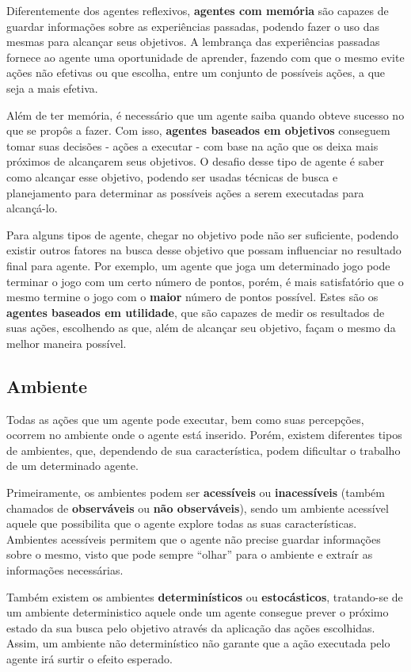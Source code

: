 Diferentemente dos agentes reflexivos, \textbf{agentes com memória} são capazes
de guardar informações sobre as experiências passadas, podendo fazer o uso das
mesmas para alcançar seus objetivos. A lembrança das experiências passadas
fornece ao agente uma oportunidade de aprender, fazendo com que o mesmo evite
ações não efetivas ou que escolha, entre um conjunto de possíveis ações, a que
seja a mais efetiva.

Além de ter memória, é necessário que um agente saiba quando obteve sucesso no
que se propôs a fazer. Com isso, \textbf{agentes baseados em objetivos}
conseguem tomar suas decisões - ações a executar - com base na ação que os
deixa mais próximos de alcançarem seus objetivos. O desafio desse tipo de
agente é saber como alcançar esse objetivo, podendo ser usadas técnicas de
busca e planejamento para determinar as possíveis ações a serem executadas para
alcançá-lo.

Para alguns tipos de agente, chegar no objetivo pode não ser suficiente,
podendo existir outros fatores na busca desse objetivo que possam influenciar
no resultado final para agente. Por exemplo, um agente que joga um determinado
jogo pode terminar o jogo com um certo número de pontos, porém, é mais
satisfatório que o mesmo termine o jogo com o \textbf{maior} número de pontos
possível. Estes são os \textbf{agentes baseados em utilidade}, que são capazes
de medir os resultados de suas ações, escolhendo as que, além de alcançar seu
objetivo, façam o mesmo da melhor maneira possível.

\subsection{Ambiente}
Todas as ações que um agente pode executar, bem como suas percepções, ocorrem
no ambiente onde o agente está inserido. Porém, existem diferentes tipos de
ambientes, que, dependendo de sua característica, podem dificultar o trabalho
de um determinado agente.

Primeiramente, os ambientes podem ser \textbf{acessíveis} ou
\textbf{inacessíveis} (também chamados de \textbf{observáveis} ou \textbf{não
observáveis}), sendo um ambiente acessível aquele que possibilita que o agente
explore todas as suas características. Ambientes acessíveis permitem que o
agente não precise guardar informações sobre o mesmo, visto que pode sempre
``olhar'' para o ambiente e extraír as informações necessárias.

Também existem os ambientes \textbf{determinísticos} ou \textbf{estocásticos},
tratando-se de um ambiente deterministico aquele onde um agente consegue prever
o próximo estado da sua busca pelo objetivo através da aplicação das ações
escolhidas. Assim, um ambiente não determinístico não garante que a ação
executada pelo agente irá surtir o efeito esperado.

